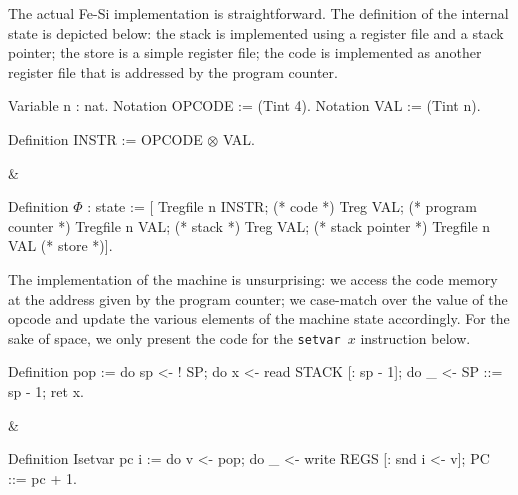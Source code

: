 \documentclass{llncs}
\begin{document}
The actual Fe-Si implementation is straightforward. The definition of
the internal state is depicted below: the stack is implemented using a
register file and a stack pointer; the store is a simple register
file; the code is implemented as another register file that is
addressed by the program counter. 

\begin{twolistings}
\begin{coq}
Variable n : nat. 
Notation OPCODE := (Tint 4).  
Notation VAL := (Tint n). 

Definition INSTR := OPCODE $\otimes$ VAL.  
$ $
\end{coq}
&
\begin{coq}
Definition $\Phi$ : state := [
Tregfile n INSTR;       (* code *)
Treg VAL;               (* program counter *)
Tregfile n VAL;         (* stack *)
Treg VAL;               (* stack pointer *)
Tregfile n VAL          (* store *)]. 
\end{coq}
\end{twolistings}

The implementation of the machine is unsurprising: we access
the code memory at the address given by the program counter; we
case-match over the value of the opcode and update the various
elements of the machine state accordingly. 
%
For the sake of space, we only present the code for the \texttt{setvar
  $x$} instruction below.

\begin{twolistings}
\begin{coq}
Definition pop :=
do sp <- ! SP;       
do x <- read STACK [: sp - 1];
do _ <- SP ::= sp - 1;
ret x.    
\end{coq}
&
\begin{coq}
Definition Isetvar pc i := 
do v <- pop; 
do _ <- write REGS [: snd i <- v];
PC ::= pc + 1.
$ $
\end{coq}
\end{twolistings}
\end{document}
